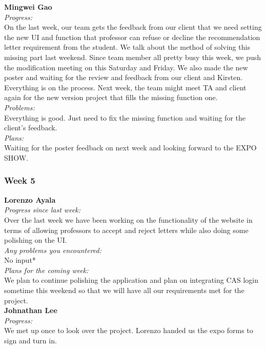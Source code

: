 \noindent\textbf{Mingwei Gao}\\
\noindent\textit{Progress:}\\
On the last week, our team gets the feedback from our client that we need setting the new UI and function that professor can refuse or decline the recommendation letter requirement from the student. We talk about the method of solving this missing part last weekend. Since team member all pretty busy this week, we push the modification meeting on this Saturday and Friday. We also made the new poster and waiting for the review and feedback from our client and Kirsten. Everything is on the process. Next week, the team might meet TA and client again for the new version project that fills the missing function one.\\

\noindent\textit{Problems:}\\
\noindent  Everything is good. Just need to fix the missing function and waiting for the client's feedback.\\

\noindent\textit{Plans:}\\
\noindent Waiting for the poster feedback on next week and looking forward to the EXPO SHOW.\\

\subsubsection{Week 5}

\textbf{Lorenzo Ayala}\\
\noindent\textit{Progress since last week:}\\
Over the last week we have been working on the functionality of the website in terms of allowing professors to accept and reject letters while also doing some polishing on the UI. \\

\noindent\textit{Any problems you encountered:}\\
\noindent *No input*\\

\noindent\textit{Plans for the coming week:}\\
\noindent We plan to continue polishing the application and plan on integrating CAS login sometime this weekend so that we will have all our requirements met for the project. \\

\noindent\textbf{Johnathan Lee}\\
\noindent\textit{Progress:}\\
We met up once to look over the project. Lorenzo handed us the expo forms to sign and turn in. \\ 

